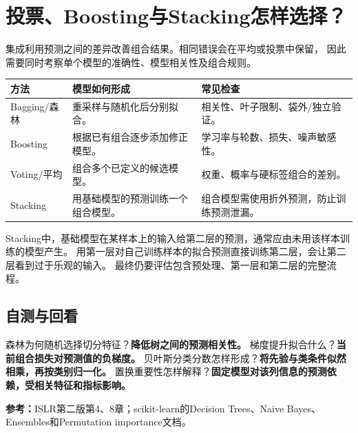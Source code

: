 \section{投票、Boosting与Stacking怎样选择？}
\label{sec:tree-compare}
集成利用预测之间的差异改善组合结果。相同错误会在平均或投票中保留，
因此需要同时考察单个模型的准确性、模型相关性及组合规则。

\begin{center}
\begin{tabularx}{\textwidth}{P{28mm}P{49mm}Y}
\toprule
方法 & 模型如何形成 & 常见检查\\
\midrule
Bagging/森林 & 重采样与随机化后分别拟合。 & 相关性、叶子限制、袋外/独立验证。\\
Boosting & 根据已有组合逐步添加修正模型。 & 学习率与轮数、损失、噪声敏感性。\\
Voting/平均 & 组合多个已定义的候选模型。 & 权重、概率与硬标签组合的差别。\\
Stacking & 用基础模型的预测训练一个组合模型。 & 组合模型需使用折外预测，防止训练预测泄漏。\\
\bottomrule
\end{tabularx}
\end{center}

Stacking中，基础模型在某样本上的输入给第二层的预测，通常应由未用该样本训练的模型产生。
用第一层对自己训练样本的拟合预测直接训练第二层，会让第二层看到过于乐观的输入。
最终仍要评估包含预处理、第一层和第二层的完整流程。

\subsection{自测与回看}
森林为何随机选择切分特征？\textbf{降低树之间的预测相关性。}
梯度提升拟合什么？\textbf{当前组合损失对预测值的负梯度。}
贝叶斯分类分数怎样形成？\textbf{将先验与类条件似然相乘，再按类别归一化。}
置换重要性怎样解释？\textbf{固定模型对该列信息的预测依赖，受相关特征和指标影响。}

\begingroup\small
\noindent\textbf{参考：}ISLR第二版第4、8章；scikit-learn的Decision Trees、Naive Bayes、Ensembles和Permutation importance文档。
\par\endgroup
